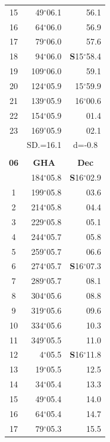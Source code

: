 \documentclass[10pt, a4paper]{report}
\begin{document}
\begin{scriptsize}
\begin{tabular*}{0.2\textwidth}[t]{@{\extracolsep{\fill}}|c|rr|}
15 & 49$^\circ$06.1 & \raisebox{0.24ex}{\boldmath$\cdot$~\boldmath$\cdot$~~}56.1\\
16 & 64$^\circ$06.0 & 56.9\\
17 & 79$^\circ$06.0 & 57.6\\[2Pt]
18 & 94$^\circ$06.0 & \textbf{S}15$^\circ$58.4\\
19 & 109$^\circ$06.0 & 59.1\\
20 & 124$^\circ$05.9 & 15$^\circ$59.9\\
21 & 139$^\circ$05.9 & 16$^\circ$00.6\\
22 & 154$^\circ$05.9 & 01.4\\
23 & 169$^\circ$05.9 & 02.1\\
\hline
\rule{0pt}{2.4ex} & \multicolumn{1}{c}{SD.=16.1} & \multicolumn{1}{c|}{d=-0.8}\\
\hline
\multicolumn{1}{c}{}\\[-0.5ex]\hline
\multicolumn{1}{|c|}{\rule{0pt}{2.6ex}\textbf{06}} & \multicolumn{1}{c}{\textbf{GHA}} & \multicolumn{1}{c|}{\textbf{Dec}}\\
\hline\rule{0pt}{2.6ex}\noindent
0 & 184$^\circ$05.8 & \textbf{S}16$^\circ$02.9\\
1 & 199$^\circ$05.8 & 03.6\\
2 & 214$^\circ$05.8 & 04.4\\
3 & 229$^\circ$05.8 & \raisebox{0.24ex}{\boldmath$\cdot$~\boldmath$\cdot$~~}05.1\\
4 & 244$^\circ$05.7 & 05.8\\
5 & 259$^\circ$05.7 & 06.6\\[2Pt]
6 & 274$^\circ$05.7 & \textbf{S}16$^\circ$07.3\\
7 & 289$^\circ$05.7 & 08.1\\
8 & 304$^\circ$05.6 & 08.8\\
9 & 319$^\circ$05.6 & \raisebox{0.24ex}{\boldmath$\cdot$~\boldmath$\cdot$~~}09.6\\
10 & 334$^\circ$05.6 & 10.3\\
11 & 349$^\circ$05.5 & 11.0\\[2Pt]
12 & 4$^\circ$05.5 & \textbf{S}16$^\circ$11.8\\
13 & 19$^\circ$05.5 & 12.5\\
14 & 34$^\circ$05.4 & 13.3\\
15 & 49$^\circ$05.4 & \raisebox{0.24ex}{\boldmath$\cdot$~\boldmath$\cdot$~~}14.0\\
16 & 64$^\circ$05.4 & 14.7\\
17 & 79$^\circ$05.3 & 15.5\\[2Pt]

\end{tabular*}
\end{scriptsize}
\end{document}
